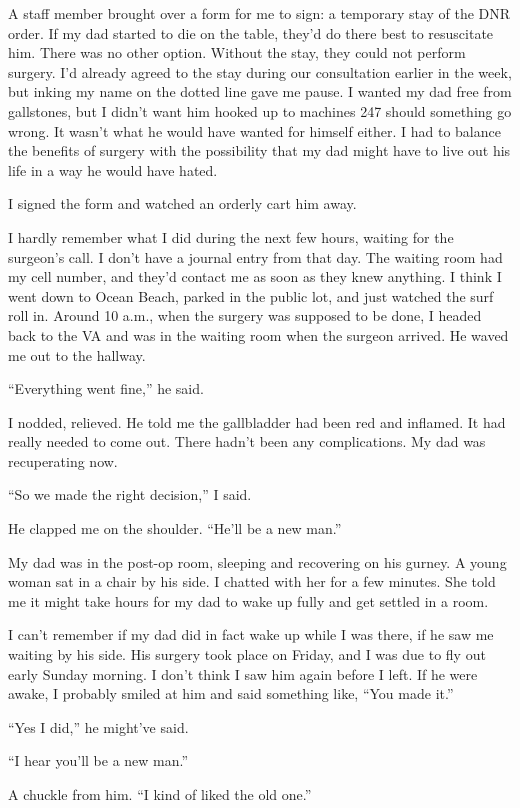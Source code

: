 \documentclass[12pt]{book}
\begin{document}
A staff member brought over a form for me to sign: a temporary stay of the DNR order. If my dad started to die on the table, they'd do there best to resuscitate him. There was no other option. Without the stay, they could not perform surgery. I'd already agreed to the stay during our consultation earlier in the week, but inking my name on the dotted line gave me pause. I wanted my dad free from gallstones, but I didn't want him hooked up to machines 24\/7 should something go wrong. It wasn't what he would have wanted for himself either. I had to balance the benefits of surgery with the possibility that my dad might have to live out his life in a way he would have hated.

I signed the form and watched an orderly cart him away.

I hardly remember what I did during the next few hours, waiting for the surgeon's call. I don't have a journal entry from that day. The waiting room had my cell number, and they'd contact me as soon as they knew anything. I think I went down to Ocean Beach, parked in the public lot, and just watched the surf roll in. Around 10 a.m., when the surgery was supposed to be done, I headed back to the VA and was in the waiting room when the surgeon arrived. He waved me out to the hallway.

``Everything went fine,'' he said.

I nodded, relieved. He told me the gallbladder had been red and inflamed. It had really needed to come out. There hadn't been any complications. My dad was recuperating now.

``So we made the right decision,'' I said.

He clapped me on the shoulder. ``He'll be a new man.''

My dad was in the post-op room, sleeping and recovering on his gurney. A young woman sat in a chair by his side. I chatted with her for a few minutes. She told me it might take hours for my dad to wake up fully and get settled in a room.

I can't remember if my dad did in fact wake up while I was there, if he saw me waiting by his side. His surgery took place on Friday, and I was due to fly out early Sunday morning. I don't think I saw him again before I left. If he were awake, I probably smiled at him and said something like, ``You made it.''

``Yes I did,'' he might've said.

``I hear you'll be a new man.''

A chuckle from him. ``I kind of liked the old one.'' 
\end{document}
